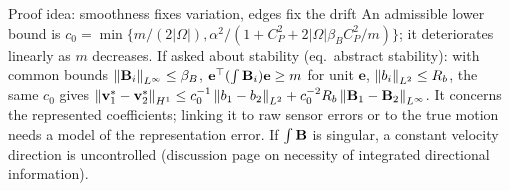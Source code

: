 \begin{frame}{Proof idea: smoothness fixes variation, edges fix the drift}
{An admissible lower bound is $c_0=\min\{m/(2|\Omega|),\alpha^2/(1+C_P^2+2|\Omega|\beta_BC_P^2/m)\}$; it deteriorates linearly as $m$ decreases. If asked about stability (eq.\ abstract stability): with common bounds $\left\lVert\mathbf B_i\right\rVert_{L^\infty}\le\beta_B$, $\mathbf e^\top(\int\mathbf B_i)\mathbf e\ge m$ for unit $\mathbf e$, $\left\lVert b_i\right\rVert_{L^2}\le R_b$, the same $c_0$ gives $\left\lVert\mathbf v_1^*-\mathbf v_2^*\right\rVert_{H^1}\le c_0^{-1}\left\lVert b_1-b_2\right\rVert_{L^2}+c_0^{-2}R_b\left\lVert\mathbf B_1-\mathbf B_2\right\rVert_{L^\infty}$. It concerns the represented coefficients; linking it to raw sensor errors or to the true motion needs a model of the representation error. If $\int\mathbf B$ is singular, a constant velocity direction is uncontrolled (discussion page on necessity of integrated directional information).}
\end{frame}



